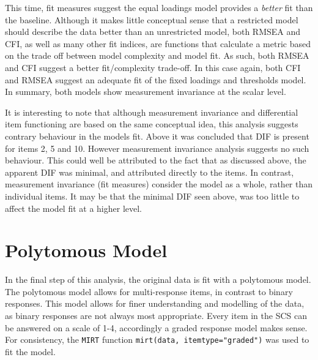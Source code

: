 \documentclass[
  man,floatsintext]{apa6}
\begin{document}
This time, fit measures suggest the equal loadings model provides a \emph{better} fit than the baseline. Although it makes little conceptual sense that a restricted model should describe the data better than an unrestricted model, both RMSEA and CFI, as well as many other fit indices, are functions that calculate a metric based on the trade off between model complexity and model fit. As such, both RMSEA and CFI suggest a better fit/complexity trade-off. In this case again, both CFI and RMSEA suggest an adequate fit of the fixed loadings and thresholds model. In summary, both models show measurement invariance at the scalar level.

It is interesting to note that although measurement invariance and differential item functioning are based on the same conceptual idea, this analysis suggests contrary behaviour in the models fit. Above it was concluded that DIF is present for items 2, 5 and 10. However measurement invariance analysis suggests no such behaviour. This could well be attributed to the fact that as discussed above, the apparent DIF was minimal, and attributed directly to the items. In contrast, measurement invariance (fit measures) consider the model as a whole, rather than individual items. It may be that the minimal DIF seen above, was too little to affect the model fit at a higher level.

\hypertarget{polytomous-model}{%
\section{Polytomous Model}\label{polytomous-model}}

In the final step of this analysis, the original data is fit with a polytomous model. The polytomous model allows for multi-response items, in contrast to binary responses. This model allows for finer understanding and modelling of the data, as binary responses are not always most appropriate. Every item in the SCS can be answered on a scale of 1-4, accordingly a graded response model makes sense. For consistency, the \texttt{MIRT} function \texttt{mirt(data,\ itemtype="graded")} was used to fit the model.

\begin{table}[H]
\centering
{}
\end{table}
\end{document}
